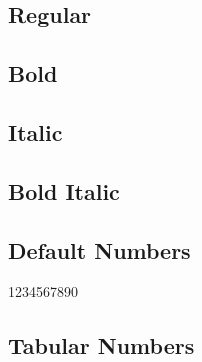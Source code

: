 \documentclass{article}
\begin{document}
\subsection*{Regular}
\lipsum[1]


\subsection*{Bold}

\textbf{\lipsum[2]}


\subsection*{Italic}

\textit{\lipsum[3]}

\subsection*{Bold Italic}

\textbf{\textit{\lipsum[4]}}


\subsection*{Default Numbers}

1234567890

\subsection*{Tabular Numbers}
{}
\end{document}
